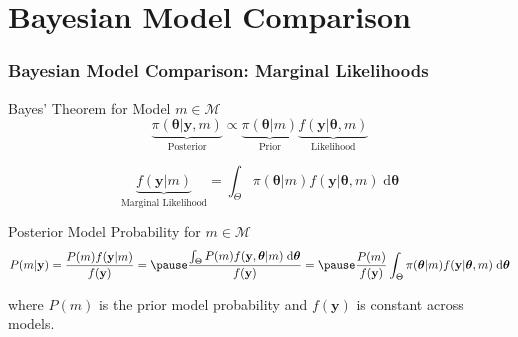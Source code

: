 \section{Bayesian Model Comparison}
\begin{frame}
  \frametitle{Bayesian Model Comparison: Marginal Likelihoods}



  \begin{block}{Bayes' Theorem for Model $m\in\mathcal{M}$}
    \footnotesize
    \vspace{-1em}
  \[
    \underbrace{\pi(\boldsymbol{\theta}|\mathbf{y},m)}_{\text{Posterior}} \propto \underbrace{\pi(\boldsymbol{\theta}|m)}_{\text{Prior}}\underbrace{ f(\mathbf{y}|\boldsymbol{\theta},m)}_{\text{Likelihood}}
  \]

  \[
   \underbrace{f(\mathbf{y}|m)}_{\text{Marginal Likelihood}} = \int_\Theta \pi(\boldsymbol{\theta}|m)f(\mathbf{y}|\boldsymbol{\theta},m)\; \text{d}\boldsymbol{\theta}
  \]
  \end{block}

  \pause

  \begin{block}{Posterior Model Probability for $m \in \mathcal{M}$}
    \footnotesize
    \vspace{-1em}
   \[
     P(m|\mathbf{y}) = \frac{P(m)f(\mathbf{y}|m)}{f(\mathbf{y})} = \pause \frac{\int_\Theta P(m) f(\mathbf{y},\boldsymbol{\theta}|m)\;  \text{d}\boldsymbol{\theta}}{f(\mathbf{y})} = \pause \frac{P(m)}{f(\mathbf{y})} \int_\Theta \pi(\boldsymbol{\theta}|m)f(\mathbf{y}|\boldsymbol{\theta},m)\; \text{d}\boldsymbol{\theta} 
   \]

   where $P(m)$ is the \alert{prior model probability} and $f(\mathbf{y})$ is constant across models.
  \end{block}

\end{frame}
%
%
%
%
%
